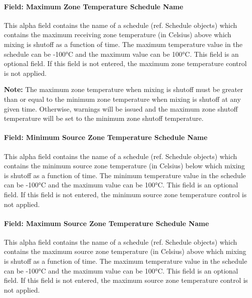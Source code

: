 \paragraph{Field: Maximum Zone Temperature Schedule Name}\label{field-maximum-zone-temperature-schedule-name}

This alpha field contains the name of a schedule (ref. Schedule objects) which contains the maximum receiving zone temperature (in Celsius) above which mixing is shutoff as a function of time. The maximum temperature value in the schedule can be -100°C and the maximum value can be 100°C. This field is an optional field. If this field is not entered, the maximum zone temperature control is not applied.

\textbf{Note:} The maximum zone temperature when mixing is shutoff must be greater than or equal to the minimum zone temperature when mixing is shutoff at any given time. Otherwise, warnings will be issued and the maximum zone shutoff temperature will be set to the minimum zone shutoff temperature.

\paragraph{Field: Minimum Source Zone Temperature Schedule Name}\label{field-minimum-source-zone-temperature-schedule-name}

This alpha field contains the name of a schedule (ref. Schedule objects) which contains the minimum source zone temperature (in Celsius) below which mixing is shutoff as a function of time. The minimum temperature value in the schedule can be -100°C and the maximum value can be 100°C. This field is an optional field. If this field is not entered, the minimum source zone temperature control is not applied.

\paragraph{Field: Maximum Source Zone Temperature Schedule Name}\label{field-maximum-source-zone-temperature-schedule-name}

This alpha field contains the name of a schedule (ref. Schedule objects) which contains the maximum source zone temperature (in Celsius) above which mixing is shutoff as a function of time. The maximum temperature value in the schedule can be -100°C and the maximum value can be 100°C. This field is an optional field. If this field is not entered, the maximum source zone temperature control is not applied.

